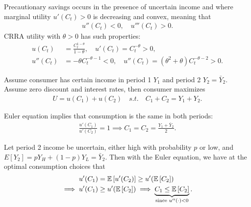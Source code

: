 \documentclass[../main.tex]{subfiles}
\begin{document}
        Precautionary savings occurs in the presence of uncertain income and where marginal utility $u'(C_t) > 0$ is decreasing and convex, meaning that
        \begin{align}
            u''(C_t) < 0, \quad
            u'''(C_t) > 0.
        \end{align}
        CRRA utility with $\theta > 0$ has such properties:
        \begin{align}
            u(C_t)
            &= \frac{C_t^{1-\theta}}{1-\theta},
            \quad
            u'(C_t)
            = C_t^{-\theta} > 0,
            \\
            u''(C_t)
            &= -\theta C_t^{-\theta-1} < 0,
            \quad
            u''(C_t)
            = (\theta^2+\theta) C_t^{-\theta-2} > 0.
        \end{align}
        
        Assume consumer has certain income in period 1 $Y_1$ and period 2 $Y_2 = \bar Y_2$. Assume zero discount and interest rates, then consumer maximizes
        \begin{align}
            U = u(C_1) + u(C_2)
            \quad s.t.
            \quad
            C_1 + C_2 = Y_1 + Y_2.
        \end{align}
        
        Euler equation implies that consumption is the same in both periods:
        \begin{align}
            \frac{u'(C_1)}{u'(C_2)} = 1
            \implies
            C_1 = C_2 = \frac{Y_1 + \bar Y_2}{2}.
        \end{align}
        
        Let period 2 income be uncertain, either high with probability $p$ or low, and $E[Y_2] = p Y_H + (1-p) Y_L = \bar Y_2.$ Then with the Euler equation, we have at the optimal consumption choices that
        \begin{align}
            u'(C_1)
            &= \mathbb{E}\left[u'(C_2)\right]
            \ge u'(\mathbb{E}\left[C_2\right])
            \\
            \implies
            u'(C_1) &\ge u'(\mathbb{E}\left[C_2\right])
            \implies
            \underbrace{
                C_1 \le \mathbb{E}\left[C_2\right]
            }_{\text{since } u''(\cdot) < 0}.
        \end{align}
        
\end{document}
